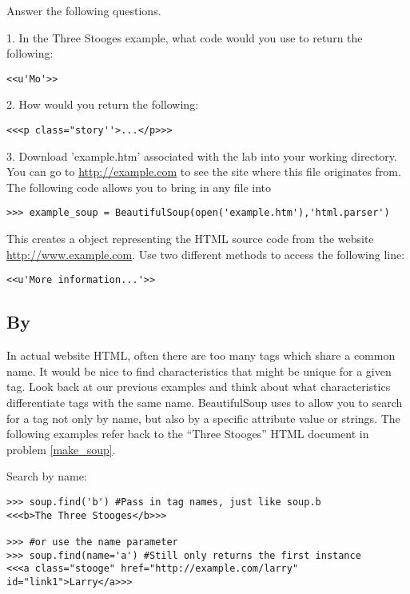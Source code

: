 \begin{problem}
Answer the following questions.

1. In the Three Stooges example, what code would you use to return the following:
\begin{lstlisting}
<<u'Mo'>>
\end{lstlisting}
2. How would you return the following:
\begin{lstlisting}
<<<p class="story''>...</p>>>
\end{lstlisting}
3. Download 'example.htm' associated with the lab into your working directory.
You can go to \url{http://example.com} to see the site where this file originates from.
The following code allows you to bring in any file into 
\begin{lstlisting}
>>> example_soup = BeautifulSoup(open('example.htm'),'html.parser')
\end{lstlisting}
This creates a  object representing the HTML source code from the website \url{http://www.example.com}.
Use two different methods to access the following line:
\begin{lstlisting}
<<u'More information...'>>
\end{lstlisting}
\end{problem}

\subsection*{By }

In actual website HTML, often there are too many tags which share a common name.
It would be nice to find characteristics that might be unique for a given tag.
Look back at our previous examples and think about what characteristics differentiate tags with the same name.
BeautifulSoup uses  to allow you to search for a tag not only by name, but also by a specific attribute value or strings.
The following examples refer back to the ``Three Stooges'' HTML document in problem \ref{make_soup}.

Search by name:
\begin{lstlisting}
>>> soup.find('b') #Pass in tag names, just like soup.b
<<<b>The Three Stooges</b>>>

>>> #or use the name parameter
>>> soup.find(name='a') #Still only returns the first instance
<<<a class="stooge" href="http://example.com/larry" id="link1">Larry</a>>>

\end{lstlisting}

